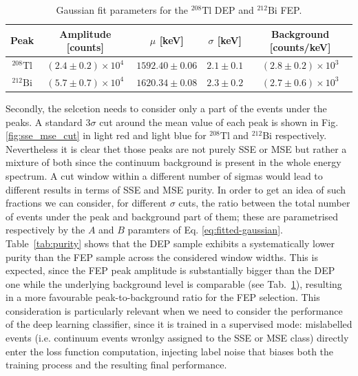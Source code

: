 \begin{table}[H]
  \centering
  \begin{tabular}{ccccc}
    \toprule
    Peak & Amplitude [counts] & $\mu$ [keV] & $\sigma$ [keV] & Background [counts/keV] \\
    \midrule
    ${}^{208}\text{Tl}$ & $(2.4 \pm 0.2) \times 10^{4}$ & $1592.40 \pm 0.06$ & $2.1 \pm 0.1$ & $(2.8 \pm 0.2) \times 10^{3}$ \\
    ${}^{212}\text{Bi}$ & $(5.7 \pm 0.7) \times 10^{4}$ & $1620.34 \pm 0.08$ & $2.3 \pm 0.2$ & $(2.7 \pm 0.6) \times 10^{3}$ \\
    \bottomrule
  \end{tabular}
  \caption{Gaussian fit parameters for the ${}^{208}\text{Tl}$ \ac{DEP} and ${}^{212}\text{Bi}$ \ac{FEP}.}
  \label{tab:gaussianfit_parameters}
\end{table}
Secondly, the selcetion needs to consider only a part of the events under the peaks. A standard 3$\sigma$ cut around the mean value of each peak is shown in Fig. \ref{fig:sse_mse_cut} in light red and light blue for ${}^{208}$Tl and ${}^{212}$Bi respectively. Nevertheless it is clear thet those peaks are not purely \ac{SSE} or \ac{MSE} but rather a mixture of both since the continuum background is present in the whole energy spectrum. A cut window within a different number of sigmas would lead to different results in terms of \ac{SSE} and \ac{MSE} purity. In order to get an idea of such fractions we can consider, for different $\sigma$ cuts, the ratio between the total number of events under the peak and background part of them; these are parametrised respectively by the $A$ and $B$ paramters of Eq. \ref{eq:fitted-gaussian}.
Table~\ref{tab:purity} shows that the \ac{DEP} sample exhibits a systematically lower purity than the \ac{FEP} sample across the considered window widths. This is expected, since the \ac{FEP} peak amplitude is substantially bigger than the \ac{DEP} one while the underlying background level is comparable (see Tab.~\ref{tab:gaussianfit_parameters}), resulting in a more favourable peak-to-background ratio for the \ac{FEP} selection. This consideration is particularly relevant when we need to consider the performance of the deep learning classifier, since it is trained in a supervised mode: mislabelled events (i.e. continuum events wronlgy assigned to the \ac{SSE} or \ac{MSE} class) directly enter the loss function computation, injecting label noise that biases both the training process and the resulting final performance.

